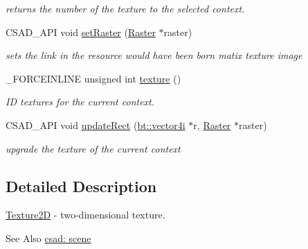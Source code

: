 \begin{DoxyCompactItemize}
\begin{DoxyCompactList}\small\item\em returns the number of the texture to the selected context. \end{DoxyCompactList}\item 
\hypertarget{classcsad_1_1_texture2_d_a0ed6920fb8f2fad4086d0a3c7238196a}{C\-S\-A\-D\-\_\-\-A\-P\-I void \hyperlink{classcsad_1_1_texture2_d_a0ed6920fb8f2fad4086d0a3c7238196a}{set\-Raster} (\hyperlink{struct_raster}{Raster} $\ast$raster)}\label{classcsad_1_1_texture2_d_a0ed6920fb8f2fad4086d0a3c7238196a}

\begin{DoxyCompactList}\small\item\em sets the link in the resource would have been born matix texture image \end{DoxyCompactList}\item 
\hypertarget{classcsad_1_1_texture2_d_abade1baf609052a87482c352e7bb7199}{\-\_\-\-F\-O\-R\-C\-E\-I\-N\-L\-I\-N\-E unsigned int \hyperlink{classcsad_1_1_texture2_d_abade1baf609052a87482c352e7bb7199}{texture} ()}\label{classcsad_1_1_texture2_d_abade1baf609052a87482c352e7bb7199}

\begin{DoxyCompactList}\small\item\em I\-D textures for the current context. \end{DoxyCompactList}\item 
\hypertarget{classcsad_1_1_texture2_d_a1e6484cf1cf507fab645af92d782b4f0}{C\-S\-A\-D\-\_\-\-A\-P\-I void \hyperlink{classcsad_1_1_texture2_d_a1e6484cf1cf507fab645af92d782b4f0}{update\-Rect} (\hyperlink{classbt_1_1vector4i}{bt\-::vector4i} $\ast$r, \hyperlink{struct_raster}{Raster} $\ast$raster)}\label{classcsad_1_1_texture2_d_a1e6484cf1cf507fab645af92d782b4f0}

\begin{DoxyCompactList}\small\item\em upgrade the texture of the current context \end{DoxyCompactList}\end{DoxyCompactItemize}


\subsection{Detailed Description}
\hyperlink{classcsad_1_1_texture2_d}{Texture2\-D} -\/ two-\/dimensional texture. 

\begin{DoxySeeAlso}{See Also}
\hyperlink{group__scene}{csad\-: scene} 
\end{DoxySeeAlso}


